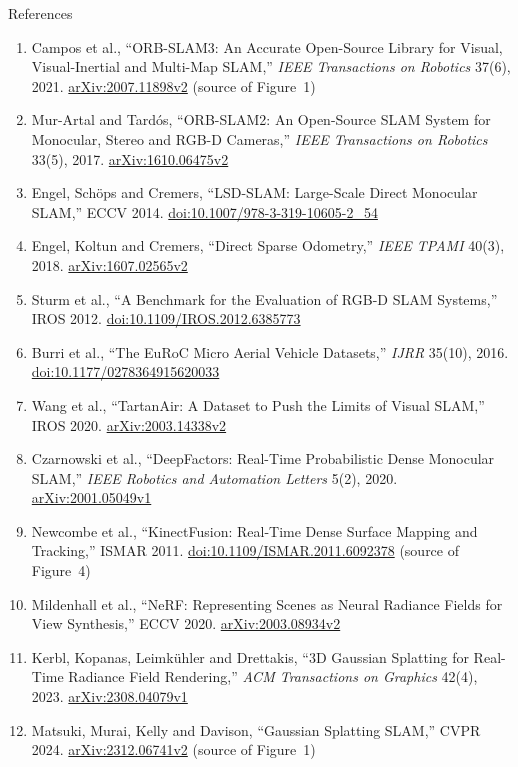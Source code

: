 \begin{frame}[allowframebreaks]{References}
\begin{enumerate}
    \item Campos et al., ``ORB-SLAM3: An Accurate Open-Source Library for Visual, Visual-Inertial and Multi-Map SLAM,'' \emph{IEEE Transactions on Robotics} 37(6), 2021. \href{https://arxiv.org/abs/2007.11898v2}{arXiv:2007.11898v2} (source of Figure~1)
    \item Mur-Artal and Tard\'os, ``ORB-SLAM2: An Open-Source SLAM System for Monocular, Stereo and RGB-D Cameras,'' \emph{IEEE Transactions on Robotics} 33(5), 2017. \href{https://arxiv.org/abs/1610.06475v2}{arXiv:1610.06475v2}
    \item Engel, Sch\"ops and Cremers, ``LSD-SLAM: Large-Scale Direct Monocular SLAM,'' ECCV 2014. \href{https://doi.org/10.1007/978-3-319-10605-2_54}{doi:10.1007/978-3-319-10605-2\_54}
    \item Engel, Koltun and Cremers, ``Direct Sparse Odometry,'' \emph{IEEE TPAMI} 40(3), 2018. \href{https://arxiv.org/abs/1607.02565v2}{arXiv:1607.02565v2}
    \item Sturm et al., ``A Benchmark for the Evaluation of RGB-D SLAM Systems,'' IROS 2012. \href{https://doi.org/10.1109/IROS.2012.6385773}{doi:10.1109/IROS.2012.6385773}
    \item Burri et al., ``The EuRoC Micro Aerial Vehicle Datasets,'' \emph{IJRR} 35(10), 2016. \href{https://doi.org/10.1177/0278364915620033}{doi:10.1177/0278364915620033}
    \item Wang et al., ``TartanAir: A Dataset to Push the Limits of Visual SLAM,'' IROS 2020. \href{https://arxiv.org/abs/2003.14338v2}{arXiv:2003.14338v2}
    \item Czarnowski et al., ``DeepFactors: Real-Time Probabilistic Dense Monocular SLAM,'' \emph{IEEE Robotics and Automation Letters} 5(2), 2020. \href{https://arxiv.org/abs/2001.05049v1}{arXiv:2001.05049v1}
    \item Newcombe et al., ``KinectFusion: Real-Time Dense Surface Mapping and Tracking,'' ISMAR 2011. \href{https://doi.org/10.1109/ISMAR.2011.6092378}{doi:10.1109/ISMAR.2011.6092378} (source of Figure~4)
    \item Mildenhall et al., ``NeRF: Representing Scenes as Neural Radiance Fields for View Synthesis,'' ECCV 2020. \href{https://arxiv.org/abs/2003.08934v2}{arXiv:2003.08934v2}
    \item Kerbl, Kopanas, Leimk\"uhler and Drettakis, ``3D Gaussian Splatting for Real-Time Radiance Field Rendering,'' \emph{ACM Transactions on Graphics} 42(4), 2023. \href{https://arxiv.org/abs/2308.04079v1}{arXiv:2308.04079v1}
    \item Matsuki, Murai, Kelly and Davison, ``Gaussian Splatting SLAM,'' CVPR 2024. \href{https://arxiv.org/abs/2312.06741v2}{arXiv:2312.06741v2} (source of Figure~1)

\end{enumerate}
\end{frame}
